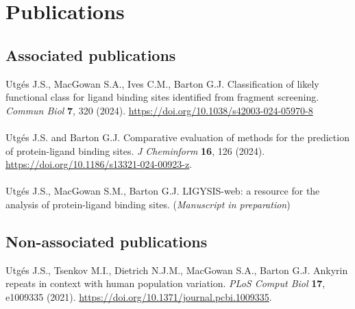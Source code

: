 \chapter*{Publications}

\section*{Associated publications}

Utgés J.S., MacGowan S.A., Ives C.M., Barton G.J. Classification of likely functional class for ligand binding sites identified from fragment screening. \textit{Commun Biol} \textbf{7}, 320 (2024). \url{https://doi.org/10.1038/s42003-024-05970-8}
\\\\ 
\noindent
Utgés J.S. and Barton G.J. Comparative evaluation of methods for the prediction of protein-ligand binding sites. \textit{J Cheminform} \textbf{16}, 126 (2024). \url{https://doi.org/10.1186/s13321-024-00923-z}.
\\\\ 
\noindent
Utgés J.S., MacGowan S.M., Barton G.J. LIGYSIS-web: a resource for the analysis of protein-ligand binding sites. (\textit{Manuscript in preparation})

\section*{Non-associated publications}

Utgés J.S., Tsenkov M.I., Dietrich N.J.M., MacGowan S.A., Barton G.J. Ankyrin repeats in context with human population variation. \textit{PLoS Comput Biol} \textbf{17}, e1009335 (2021). \url{https://doi.org/10.1371/journal.pcbi.1009335}.